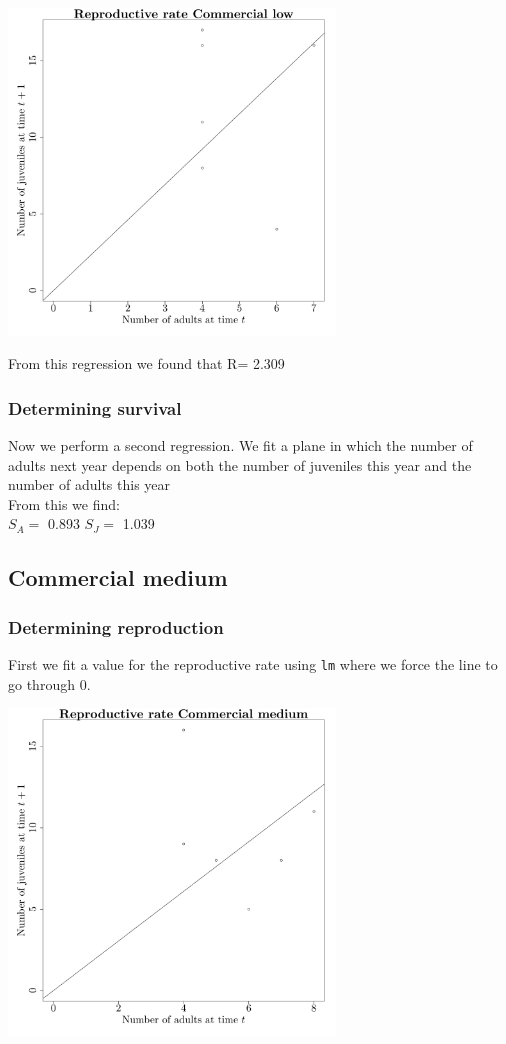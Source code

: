 \documentclass{article}\usepackage[]{graphicx}\usepackage[]{color}
\begin{document}
{\centering \includegraphics[width=0.65\textwidth]{figure/k52} 

}



 From this regression we found that R= 2.309 

\subsubsection{Determining survival}

Now we perform a second regression. We fit a plane in which the number of adults next year depends on both the number of juveniles this year and the number of adults this year\\From this we find:\\ 
$S_A=$ 0.893 
$S_J=$ 1.039 
\subsection{ Commercial medium }
\subsubsection{Determining reproduction}

First we fit a value for the reproductive rate using \texttt{lm} where we force the line to go through $0$. 



{\centering \includegraphics[width=0.65\textwidth]{figure/k53} 

}
\end{document}
